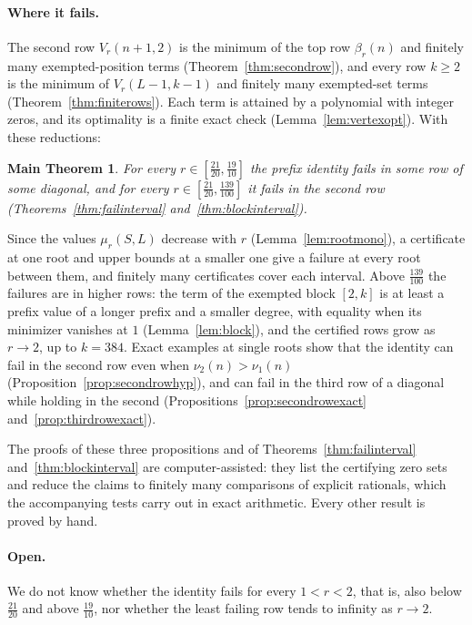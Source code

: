 \documentclass[11pt]{article}
\newtheorem*{mainthm}{Main Theorem}
\begin{document}
\paragraph{Where it fails.}
The second row $V_r(n+1,2)$ is the minimum of the top row $\beta_r(n)$ and
finitely many exempted-position terms (Theorem~\ref{thm:secondrow}), and
every row $k\ge2$ is the minimum of $V_r(L-1,k-1)$ and finitely many
exempted-set terms (Theorem~\ref{thm:finiterows}).  Each term is attained
by a polynomial with integer zeros, and its optimality is a finite exact
check (Lemma~\ref{lem:vertexopt}).  With these reductions:
\begin{mainthm}
For every $r\in[\frac{21}{20},\frac{19}{10}]$ the prefix identity fails
in some row of some diagonal, and for every
$r\in[\frac{21}{20},\frac{139}{100}]$ it fails in the second row
(Theorems~\ref{thm:failinterval} and~\ref{thm:blockinterval}).
\end{mainthm}
Since the values $\mu_r(S,L)$ decrease with $r$
(Lemma~\ref{lem:rootmono}), a certificate at one root and upper bounds at
a smaller one give a failure at every root between them, and finitely many
certificates cover each interval.  Above $\frac{139}{100}$ the failures are
in higher rows: the term of the exempted block $[2,k]$ is at least a prefix
value of a longer prefix and a smaller degree, with equality when its
minimizer vanishes at $1$ (Lemma~\ref{lem:block}), and the certified rows
grow as $r\to2$, up to $k=384$.  Exact examples at single roots show that
the identity can fail in the second row even when $\nu_2(n)>\nu_1(n)$
(Proposition~\ref{prop:secondrowhyp}), and can fail in the third row of a
diagonal while holding in the second (Propositions~\ref{prop:secondrowexact}
and~\ref{prop:thirdrowexact}).

The proofs of these three propositions and of
Theorems~\ref{thm:failinterval} and~\ref{thm:blockinterval} are
computer-assisted: they list the certifying zero sets and reduce the
claims to finitely many comparisons of explicit rationals, which the
accompanying tests carry out in exact arithmetic.  Every other result is
proved by hand.

\paragraph{Open.}
We do not know whether the identity fails for every $1<r<2$, that is,
also below $\frac{21}{20}$ and above $\frac{19}{10}$, nor whether the
least failing row tends to infinity as $r\to2$.
\end{document}
